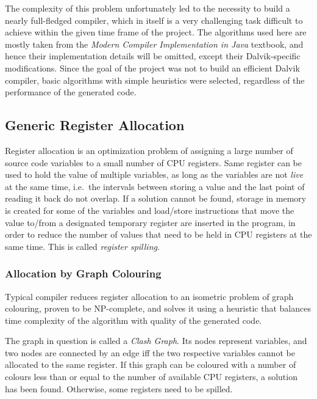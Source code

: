 \documentclass[12pt,twoside,notitlepage]{report}
\begin{document}
The complexity of this problem unfortunately led to the necessity to build a nearly full-fledged compiler, which in itself is a very challenging task difficult to achieve within the given time frame of the project.  The algorithms used here are mostly taken from the \emph{Modern Compiler Implementation in Java} textbook, and hence their implementation details will be omitted, except their Dalvik-specific modifications. Since the goal of the project was not to build an efficient Dalvik compiler, basic algorithms with simple heuristics were selected, regardless of the performance of the generated code. 

\subsection{Generic Register Allocation}

Register allocation is an optimization problem of assigning a large number of source code variables to a small number of CPU registers. Same register can be used to hold the value of multiple variables, as long as the variables are not \emph{live} at the same time, i.e.\ the intervals between storing a value and the last point of reading it back do not overlap. If a solution cannot be found, storage in memory is created for some of the variables and load/store instructions that move the value to/from a designated temporary register are inserted in the program, in order to reduce the number of values that need to be held in CPU registers at the same time. This is called \emph{register spilling}.

\subsubsection{Allocation by Graph Colouring}

Typical compiler reduces register allocation to an isometric problem of graph colouring, proven to be NP-complete, and solves it using a heuristic that balances time complexity of the algorithm with quality of the generated code. 

The graph in question is called a \emph{Clash Graph}. Its nodes represent variables, and two nodes are connected by an edge iff the two respective variables cannot be allocated to the same register. If this graph can be coloured with a number of colours less than or equal to the number of available CPU registers, a solution has been found. Otherwise, some registers need to be spilled.
\end{document}
